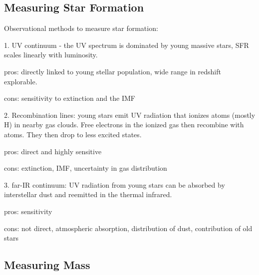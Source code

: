 \subsection{Measuring Star Formation}

Observational methods to measure star formation:

1.  UV continuum - the UV spectrum is dominated by young massive stars, SFR scales linearly with luminosity.
	
	pros:  directly linked to young stellar population, wide range in redshift explorable.
	
	cons:  sensitivity to extinction and the IMF
	
2.  Recombination lines:  young stars emit UV radiation that ionizes atoms (mostly H) in nearby gas clouds.  Free electrons in the ionized gas then recombine with atoms.  They then drop to less excited states.  

	pros:  direct and highly sensitive
	
	cons:  extinction, IMF, uncertainty in gas distribution
	
3.  far-IR continuum:  UV radiation from young stars can be absorbed by interstellar dust and reemitted in the thermal infrared.

	pros:  sensitivity
	
	cons:  not direct, atmospheric absorption, distribution of dust, contribution of old stars


\subsection{Measuring Mass}

